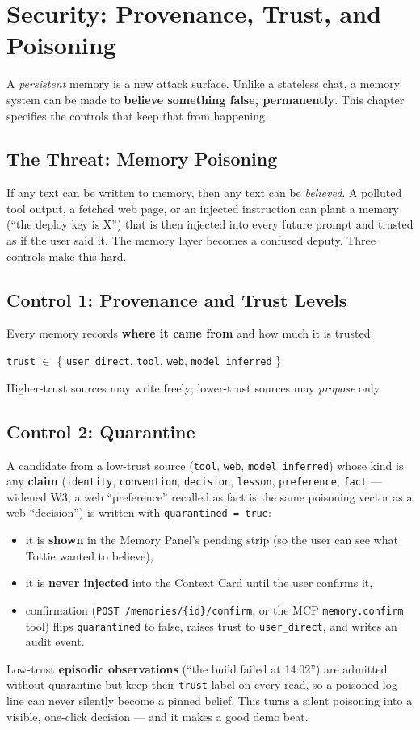 \chapter{Security: Provenance, Trust, and Poisoning}

A \emph{persistent} memory is a new attack surface. Unlike a stateless chat, a memory system can be
made to \textbf{believe something false, permanently}. This chapter specifies the controls that keep
that from happening.

\section{The Threat: Memory Poisoning}
If any text can be written to memory, then any text can be \emph{believed}. A polluted tool output, a
fetched web page, or an injected instruction can plant a memory (``the deploy key is X'') that is then
injected into every future prompt and trusted as if the user said it. The memory layer becomes a
confused deputy. Three controls make this hard.

\section{Control 1: Provenance and Trust Levels}
Every memory records \textbf{where it came from} and how much it is trusted:
\begin{center}
\texttt{trust} $\in$ \{ \texttt{user\_direct}, \texttt{tool}, \texttt{web}, \texttt{model\_inferred} \}
\end{center}
Higher-trust sources may write freely; lower-trust sources may \emph{propose} only.

\section{Control 2: Quarantine}
A candidate from a low-trust source (\texttt{tool}, \texttt{web}, \texttt{model\_inferred})
whose kind is any \textbf{claim} (\texttt{identity}, \texttt{convention}, \texttt{decision},
\texttt{lesson}, \texttt{preference}, \texttt{fact} --- widened W3; a web ``preference'' recalled
as fact is the same poisoning vector as a web ``decision'') is written with
\texttt{quarantined = true}:
\begin{itemize}
  \item it is \textbf{shown} in the Memory Panel's pending strip (so the user can see what Tottie
  wanted to believe),
  \item it is \textbf{never injected} into the Context Card until the user confirms it,
  \item confirmation (\texttt{POST /memories/\{id\}/confirm}, or the MCP
  \texttt{memory.confirm} tool) flips \texttt{quarantined} to false, raises trust to
  \texttt{user\_direct}, and writes an audit event.
\end{itemize}
Low-trust \textbf{episodic observations} (``the build failed at 14:02'') are admitted without
quarantine but keep their \texttt{trust} label on every read, so a poisoned log line can never
silently become a pinned belief. This turns a silent poisoning into a visible, one-click
decision --- and it makes a good demo beat.

